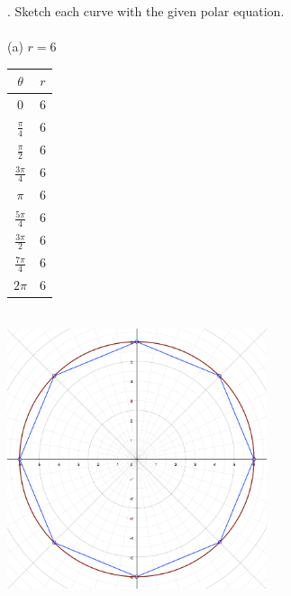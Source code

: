 \documentclass[11pt]{exam}
\begin{document}
. Sketch each curve with the given polar equation. \\
\\
\indent (a) $r=6$\\
\newline
\newline
\def\arraystretch{1.5}
\begin{tabular}{ c|c }
  $\theta$ & $r$ \\
  \hline
  0                & 6 \\
  $\frac{\pi}{4}$  & 6 \\
  $\frac{\pi}{2}$  & 6 \\
  $\frac{3\pi}{4}$ & 6 \\
  $\pi$            & 6 \\
  $\frac{5\pi}{4}$ & 6 \\
  $\frac{3\pi}{2}$ & 6 \\
  $\frac{7\pi}{4}$ & 6 \\
  $2\pi$           & 6 \\
\end{tabular}\\
\includegraphics[width=3in]{g10a.png}
\end{document}
